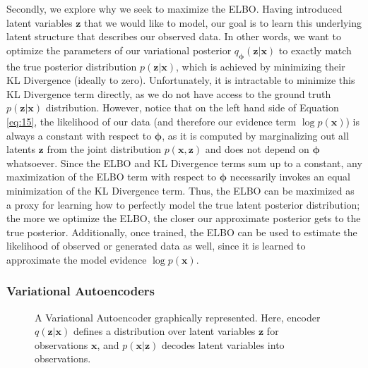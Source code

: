 Secondly, we explore why we seek to maximize the ELBO.  Having introduced latent variables $\bm{z}$ that we would like to model, our goal is to learn this underlying latent structure that describes our observed data.  In other words, we want to optimize the parameters of our variational posterior $q_{\bm{\phi}}(\bm{z}|\bm{x})$ to exactly match the true posterior distribution $p(\bm{z}|\bm{x})$, which is achieved by minimizing their KL Divergence (ideally to zero).  Unfortunately, it is intractable to minimize this KL Divergence term directly, as we do not have access to the ground truth $p(\bm{z}|\bm{x})$ distribution.  However, notice that on the left hand side of Equation \ref{eq:15}, the likelihood of our data (and therefore our evidence term $\log p(\bm{x})$) is always a constant with respect to $\bm{\phi}$, as it is computed by marginalizing out all latents $\bm{z}$ from the joint distribution $p(\bm{x}, \bm{z})$ and does not depend on $\bm{\phi}$ whatsoever.  Since the ELBO and KL Divergence terms sum up to a constant, any maximization of the ELBO term with respect to $\bm{\phi}$ necessarily invokes an equal minimization of the KL Divergence term.  Thus, the ELBO can be maximized as a proxy for learning how to perfectly model the true latent posterior distribution; the more we optimize the ELBO, the closer our approximate posterior gets to the true posterior.  Additionally, once trained, the ELBO can be used to estimate the likelihood of observed or generated data as well, since it is learned to approximate the model evidence $\log p(\bm{x})$.

\subsubsection*{Variational Autoencoders}
%
\begin{figure}
  \centering
  \caption{A Variational Autoencoder graphically represented.  Here, encoder $q(\bm{z}|\bm{x})$ defines a distribution over latent variables $\bm{z}$ for observations $\bm{x}$, and $p(\bm{x}|\bm{z})$ decodes latent variables into observations.}
  \label{fig:vae}
\end{figure}

